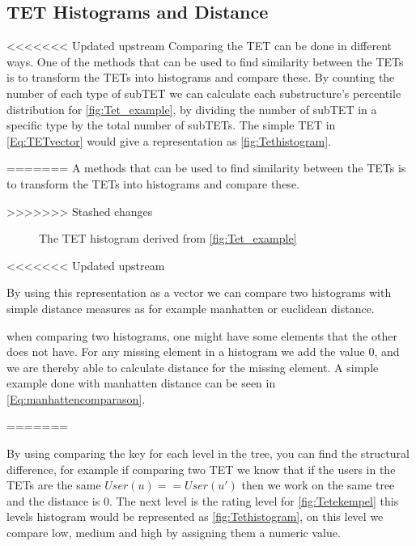 \subsection{TET Histograms and Distance}
<<<<<<< Updated upstream
	Comparing the TET can be done in different ways. One of the methods that can be used to find similarity between the TETs is to transform the TETs into histograms and compare these\cite{JAEGER201330}. By counting the number of each type of subTET we can calculate each substructure's percentile distribution for \autoref{fig:Tet_example}, by dividing the number of subTET in a specific type by the total number of subTETs. The simple TET in \autoref{Eq:TETvector} would give a representation as \autoref{fig:Tethistogram}.

=======
	A methods that can be used to find similarity between the TETs is to transform the TETs into histograms and compare these\cite{JAEGER201330}. 
	
>>>>>>> Stashed changes
	\begin{figure}[H]
		\centering
		\begin{adjustbox}{width=0.5\textwidth}
			
		\end{adjustbox}
		\caption{The TET histogram derived from \autoref{fig:Tet_example}}
		\label{fig:Tethistogram}
	\end{figure}
<<<<<<< Updated upstream

	By using this representation as a vector we can compare two histograms with simple distance measures as for example manhatten or euclidean distance.

	when comparing two histograms, one might have some elements that the other does not have. For any missing element in a histogram we add the value $0$, and we are thereby able to calculate distance for the missing element. A simple example done with manhatten distance can be seen in \autoref{Eq:manhattencomparason}\cite{singh2013k}.

=======
	
	By using comparing the key for each level in the tree, you can find the structural difference, for example if comparing two TET we know that if the users in the TETs are the same $User(u) == User(u')$ then we work on the same tree and the distance is $0$. The next level is the rating level for \autoref{fig:Tetekempel} this levels histogram would be represented as \autoref{fig:Tethistogram}, on this level we compare low, medium and high by assigning them a numeric value.
	
